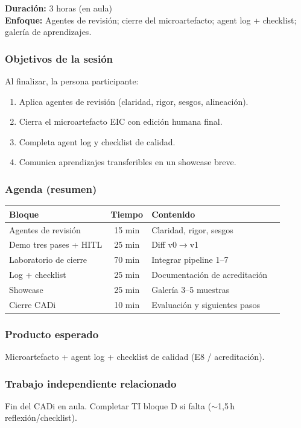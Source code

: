 \textbf{Duración:} 3 horas (en aula)\\
\textbf{Enfoque:} Agentes de revisión; cierre del microartefacto; agent log + checklist; galería de aprendizajes.

\subsubsection*{Objetivos de la sesión}
Al finalizar, la persona participante:
\begin{enumerate}
\item Aplica agentes de revisión (claridad, rigor, sesgos, alineación).
\item Cierra el microartefacto EIC con edición humana final.
\item Completa agent log y checklist de calidad.
\item Comunica aprendizajes transferibles en un showcase breve.
\end{enumerate}

\subsubsection*{Agenda (resumen)}
\begin{tabularx}{\textwidth}{@{}lclX@{}}
\toprule
Bloque & Tiempo & Contenido \\
\midrule
Agentes de revisión & 15 min & Claridad, rigor, sesgos \\
Demo tres pases + HITL & 25 min & Diff v0$\rightarrow$v1 \\
Laboratorio de cierre & 70 min & Integrar pipeline 1--7 \\
Log + checklist & 25 min & Documentación de acreditación \\
Showcase & 25 min & Galería 3--5 muestras \\
Cierre CADi & 10 min & Evaluación y siguientes pasos \\
\bottomrule
\end{tabularx}

\subsubsection*{Producto esperado}
Microartefacto + agent log + checklist de calidad (E8 / acreditación).

\subsubsection*{Trabajo independiente relacionado}
Fin del CADi en aula. Completar TI bloque D si falta ($\sim$1{,}5\,h reflexión/checklist).
